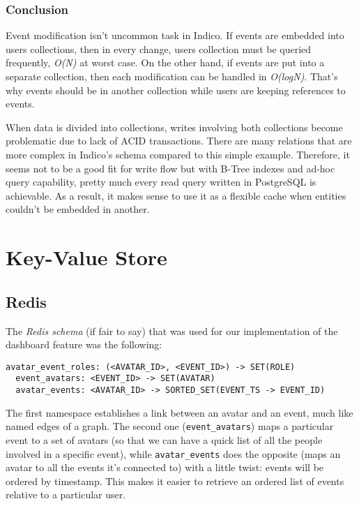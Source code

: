 \subsubsection*{Conclusion}

Event modification isn't uncommon task in Indico. If events are embedded into users collections, then in every change, users collection must be queried frequently, \textit{O(N)} at worst case. On the other hand, if events are put into a separate collection, then each modification can be handled in \textit{O(logN)}. That's why events should be in another collection while users are keeping references to events.

When data is divided into collections, writes involving both collections become problematic due to lack of ACID transactions. There are many relations that are more complex in Indico's schema compared to this simple example. Therefore, it seems not to be a good fit for write flow but with B-Tree indexes and ad-hoc query capability, pretty much every read query written in PostgreSQL is achievable. As a result, it makes sense to use it as a flexible cache when entities couldn't be embedded in another.

\section{Key-Value Store}

\subsection{Redis}

The \textit{Redis schema} (if fair to say) that was used for our implementation of the dashboard feature was the following:

\begin{lstlisting}[caption=Dashboard Schema in Redis]
  avatar_event_roles: (<AVATAR_ID>, <EVENT_ID>) -> SET(ROLE)
  event_avatars: <EVENT_ID> -> SET(AVATAR)
  avatar_events: <AVATAR_ID> -> SORTED_SET(EVENT_TS -> EVENT_ID)
\end{lstlisting}

The first namespace establishes a link between an avatar and an event, much like named edges of a graph. The second one (\texttt{event\_avatars}) maps a particular event to a set of avatars (so that we can have a quick list of all the people involved in a specific event), while \texttt{avatar\_events} does the opposite (maps an avatar to all the events it's connected to) with a little twist: events will be ordered by timestamp. This makes it easier to retrieve an ordered list of events relative to a particular user.

